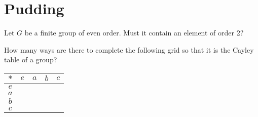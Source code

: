 \documentclass[answers]{exam}
\begin{document}
\section*{Pudding}
\begin{questions}

\question%
Let $G$ be a finite group of even order. Must it contain an element of order 2?



\question%



\question%
How many ways are there to complete the following grid so that it is the Cayley table of a group?
\begin{center}\begin{tabular}{c|cccc}
	$*$ & $e$ & $a$ & $b$ & $c$\\
	\hline
	$e$\\
	$a$\\
	$b$\\
	$c$\\
\end{tabular}\end{center}

\end{questions}
\end{document}
